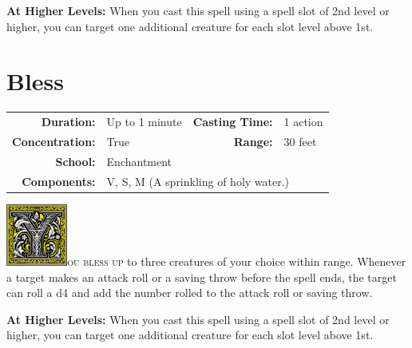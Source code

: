 \documentclass[12pt,showtrims]{memoir}
\begin{document}
\vspace{8pt} \noindent\textbf{At Higher Levels:} When you cast this spell using a spell slot of 2nd level or higher, you can target one additional creature for each slot level above 1st.
\newpage

\newpage
\section*{Bless}

{
\small\centering\vspace{-6pt}
\begin{tabular}{rlrl}
\toprule

\textbf{Duration:} & Up to 1 minute &
\textbf{Casting Time:} & 1 action \\
\textbf{Concentration:} & True &
\textbf{Range:} & 30 feet \\
\textbf{School:} & Enchantment \\
\textbf{Components:} & \multicolumn{3}{p{0.7\textwidth}}{V, S, M (A sprinkling of holy water.)}\\

\bottomrule
\end{tabular}
}

\vspace{1\baselineskip}\noindent
\lettrine[lines=4]{\includegraphics[height=58pt]{initials/Y.png}}{ou bless up} to three creatures of your choice within range. Whenever a target makes an attack roll or a saving throw before the spell ends, the target can roll a d4 and add the number rolled to the attack roll or saving throw.

\vspace{8pt} \noindent\textbf{At Higher Levels:} When you cast this spell using a spell slot of 2nd level or higher, you can target one additional creature for each slot level above 1st.
\newpage

\newpage
\end{document}
